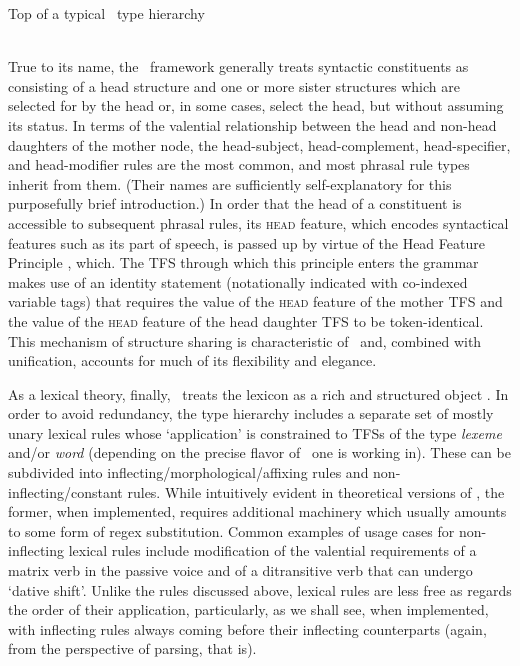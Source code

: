 \begin{exe}[h]
    \ex\label{simpleTypeHierachy}Top of a typical \hpsg\ type hierarchy\\\\
\end{exe}

True to its name, the \hpsg\ framework generally treats syntactic constituents
as consisting of a head structure and one or more sister structures which are
selected for by the head or, in some cases, select the head, but without
assuming its status. In terms of the valential relationship between the head
and non-head daughters of the mother node, the head-subject, head-complement,
head-specifier, and head-modifier rules are the most common, and most phrasal
rule types inherit from them. (Their names are sufficiently self-explanatory
for this purposefully brief introduction.) In order that the head of a
constituent is accessible to subsequent phrasal rules, its \textsc{head}
feature, which encodes syntactical features such as its part of speech, is
passed up by virtue of the Head Feature Principle \citep{sag2003syntactic},
which. The TFS through which this principle enters the grammar makes use of an
identity statement (notationally indicated with co-indexed variable tags) that
requires the value of the \textsc{head} feature of the mother TFS and the value
of the \textsc{head} feature of the head daughter TFS to be token-identical.
This mechanism of structure sharing is characteristic of \hpsg\, and, combined
with unification, accounts for much of its flexibility and elegance.

As a lexical theory, finally, \hpsg\ treats the lexicon as a rich and
structured object \citep{muller13hpsg-synopsis}. In order to avoid redundancy,
the type hierarchy includes a separate set of mostly unary lexical rules whose
`application' is constrained to TFSs of the type \emph{lexeme} and/or
\emph{word} (depending on the precise flavor of \hpsg\ one is working in).
These can be subdivided into inflecting/morphological/affixing rules and
non-inflecting/constant rules. While intuitively evident in theoretical
versions of \hpsg, the former, when implemented, requires additional machinery
which usually amounts to some form of regex substitution. Common examples of
usage cases for non-inflecting lexical rules include modification of the
valential requirements of a matrix verb in the passive voice and of a
ditransitive verb that can undergo `dative shift'. Unlike the rules discussed
above, lexical rules are less free as regards the order of their application,
particularly, as we shall see, when implemented, with inflecting rules always
coming before their inflecting counterparts (again, from the perspective of
parsing, that is).

